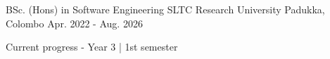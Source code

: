 

\begin{cventries}

  \cventry
    {BSc. (Hons) in Software Engineering} %
    {SLTC Research University} %
    {Padukka, Colombo} %
    {Apr. 2022 - Aug. 2026} %
    {
      \begin{cvitems} %
        \item {Current progress - Year 3 | 1st semester}
      \end{cvitems}
    }

\end{cventries}
